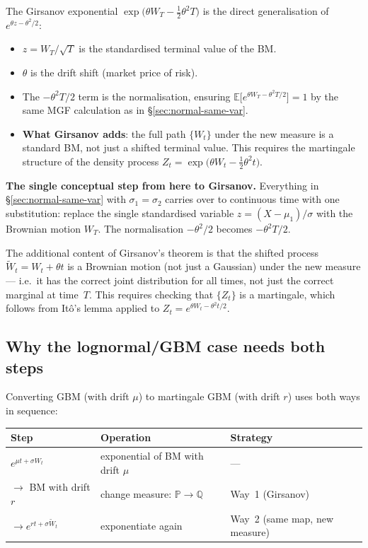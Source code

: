 \documentclass[11pt,a4paper]{article}
\newcommand{\E}{\mathbb{E}}
\begin{document}
\noindent
The Girsanov exponential $\exp\!\bigl(\theta W_T-\tfrac{1}{2}\theta^2 T\bigr)$ is the direct
generalisation of $e^{\theta z-\theta^2/2}$:
\begin{itemize}
  \item $z=W_T/\!\sqrt{T}$ is the standardised terminal value of the BM.
  \item $\theta$ is the drift shift (market price of risk).
  \item The $-\theta^2 T/2$ term is the normalisation, ensuring
        $\E\!\bigl[e^{\theta W_T-\theta^2 T/2}\bigr]=1$ by the same MGF calculation as in
        \S\ref{sec:normal-same-var}.
  \item \textbf{What Girsanov adds}: the full path $\{W_t\}$ under the new measure is a
        standard BM, not just a shifted terminal value.  This requires the martingale structure
        of the density process $Z_t=\exp\!\bigl(\theta W_t-\tfrac{1}{2}\theta^2 t\bigr)$.
\end{itemize}

\medskip\noindent\textbf{The single conceptual step from here to Girsanov.}
Everything in \S\ref{sec:normal-same-var} with $\sigma_1=\sigma_2$ carries over to continuous
time with one substitution: replace the single standardised variable $z=(X-\mu_1)/\sigma$ with
the Brownian motion $W_T$.  The normalisation $-\theta^2/2$ becomes $-\theta^2 T/2$.

The additional content of Girsanov's theorem is that the shifted process
$\widetilde{W}_t=W_t+\theta t$ is a Brownian motion (not just a Gaussian) under the new
measure --- i.e.\ it has the correct joint distribution for all times, not just the correct
marginal at time~$T$.  This requires checking that $\{Z_t\}$ is a martingale, which follows
from It\^o's lemma applied to $Z_t=e^{\theta W_t-\theta^2 t/2}$.

\subsection{Why the lognormal/GBM case needs both steps}

Converting GBM (with drift $\mu$) to martingale GBM (with drift $r$) uses both ways in
sequence:

\begin{center}
\begin{tabular}{lll}
\toprule
\textbf{Step} & \textbf{Operation} & \textbf{Strategy} \\
\midrule
$e^{\mu t+\sigma W_t}$ & exponential of BM with drift $\mu$ & --- \\
$\to$ BM with drift $r$ & change measure: $\mathbb{P}\to\mathbb{Q}$ & Way~1 (Girsanov) \\
$\to e^{rt+\sigma\widetilde{W}_t}$ & exponentiate again & Way~2 (same map, new measure) \\
\bottomrule
\end{tabular}
\end{center}
\end{document}
